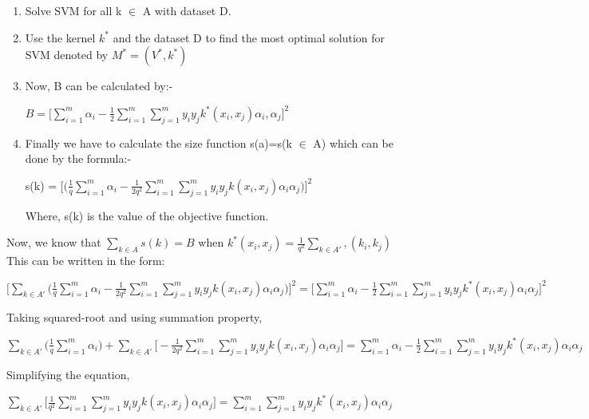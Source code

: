 \documentclass[12pt,a4paper,final]{report}
\begin{document}
\begin{itemize}
\begin{enumerate}
\item
Solve SVM for all k $\in$ A with dataset D.
\item
Use the kernel $k^*$ and the dataset D to find the most optimal solution for SVM denoted by $M^* = (V^*,k^*)$
\item 
Now, B can be calculated by:- \\
\begin{center}
$B = \Big[\sum_{i=1}^{m} \alpha_i - \frac{1}{2}\sum_{i=1}^{m}\sum_{j=1}^{m}y_iy_jk^*(x_i,x_j)\alpha_i,\alpha_j\Big]^2$
\end{center} 
\item
Finally we have to calculate the size function s(a)=s(k $\in$ A) which can be done by the formula:- \\
\begin{center}
s(k) = $\Big[\big(\frac{1}{q}\sum_{i=1}^{m}\alpha_i - \frac{1}{2q^2}\sum_{i=1}^{m}\sum_{j=1}^{m}y_iy_jk(x_i,x_j)\alpha_i\alpha_j\Big)\Big]^2$ \\
\end{center}
Where, s(k) is the value of the objective function. 
\end{enumerate} 
Now, we know that $\sum_{k \in A}^{}s(k)=B$ when $k^*(x_i,x_j)=\frac{1}{q^2}\sum_{k \in A'}^{},(k_i,k_j)$ \\
This can be written in the form: \\
\begin{center}
$\Big[\sum_{k \in A'}^{}\Big(\frac{1}{q}\sum_{i=1}^{m}\alpha_i - \frac{1}{2q^2}\sum_{i=1}^{m}\sum_{j=1}^{m}y_iy_jk(x_i,x_j)\alpha_i\alpha_j\Big) \Big]^2 = \Big[\sum_{i=1}^{m} \alpha_i - \frac{1}{2}\sum_{i=1}^{m}\sum_{j=1}^{m}y_iy_jk^*(x_i,x_j)\alpha_i\alpha_j\Big]^2$ \\
\end{center}
Taking squared-root and using summation property, \\
\begin{center}
$\sum_{k \in A'}\Big(\frac{1}{q}\sum_{i=1}^{m}\alpha_i\Big)+\sum_{k \in A'}^{}\Big[-\frac{1}{2q^2}\sum_{i=1}^{m}\sum_{j=1}^{m}y_iy_jk(x_i,x_j)\alpha_i\alpha_j\Big] = \sum_{i=1}^{m}\alpha_i-\frac{1}{2}\sum_{i=1}^{m}\sum_{j=1}^{m}y_iy_jk^*(x_i,x_j)\alpha_i\alpha_j$ \\
\end{center}
Simplifying the equation,
\begin{center}
$\sum_{k \in A'}\Big[\frac{1}{q^2}\sum_{i=1}^{m}\sum_{j=1}^{m}y_iy_jk(x_i,x_j)\alpha_i\alpha_j\Big] = \sum_{i=1}^{m}\sum_{j=1}^{m}y_iy_jk^*(x_i,x_j)\alpha_i\alpha_j$

\end{center}
\end{itemize}
\end{document}
